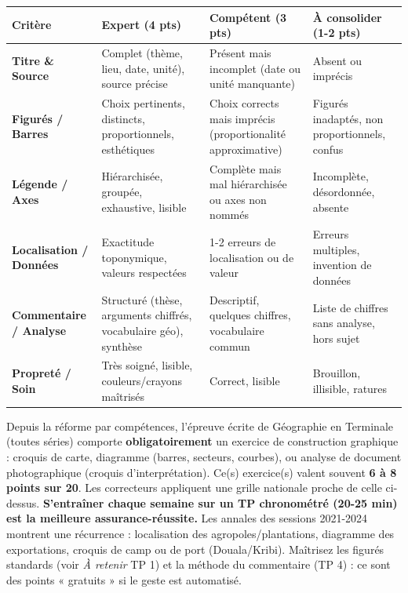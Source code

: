 \documentclass[11pt]{article}
\begin{document}
\begin{center}
\begin{tabularx}{\linewidth}{|>{\bfseries}l|X|X|X|}\hline
\rowcolor{popblueL}
\textbf{Critère} & \textbf{Expert (4 pts)} & \textbf{Compétent (3 pts)} & \textbf{À consolider (1-2 pts)} \\ \hline
\textbf{Titre \& Source} & Complet (thème, lieu, date, unité), source précise & Présent mais incomplet (date ou unité manquante) & Absent ou imprécis \\ \hline
\textbf{Figurés / Barres} & Choix pertinents, distincts, proportionnels, esthétiques & Choix corrects mais imprécis (proportionalité approximative) & Figurés inadaptés, non proportionnels, confus \\ \hline
\textbf{Légende / Axes} & Hiérarchisée, groupée, exhaustive, lisible & Complète mais mal hiérarchisée ou axes non nommés & Incomplète, désordonnée, absente \\ \hline
\textbf{Localisation / Données} & Exactitude toponymique, valeurs respectées & 1-2 erreurs de localisation ou de valeur & Erreurs multiples, invention de données \\ \hline
\textbf{Commentaire / Analyse} & Structuré (thèse, arguments chiffrés, vocabulaire géo), synthèse & Descriptif, quelques chiffres, vocabulaire commun & Liste de chiffres sans analyse, hors sujet \\ \hline
\textbf{Propreté / Soin} & Très soigné, lisible, couleurs/crayons maîtrisés & Correct, lisible & Brouillon, illisible, ratures \\ \hline
\end{tabularx}
\end{center}

\begin{savaistu}
Depuis la réforme par compétences, l'épreuve écrite de Géographie en Terminale (toutes séries) comporte \textbf{obligatoirement} un exercice de construction graphique : croquis de carte, diagramme (barres, secteurs, courbes), ou analyse de document photographique (croquis d'interprétation). Ce(s) exercice(s) valent souvent \textbf{6 à 8 points sur 20}. Les correcteurs appliquent une grille nationale proche de celle ci-dessus. \textbf{S'entraîner chaque semaine sur un TP chronométré (20-25 min) est la meilleure assurance-réussite.} Les annales des sessions 2021-2024 montrent une récurrence : localisation des agropoles/plantations, diagramme des exportations, croquis de camp ou de port (Douala/Kribi). Maîtrisez les figurés standards (voir \emph{À retenir} TP 1) et la méthode du commentaire (TP 4) : ce sont des points « gratuits » si le geste est automatisé.
\end{savaistu}
\end{document}
